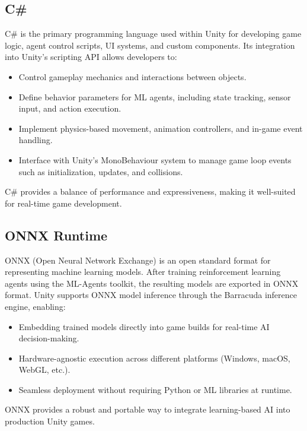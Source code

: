 \documentclass[12pt,oneside,openright,a4paper]{cpe-english-project}
\begin{document}
\subsection{C\#}
C\# is the primary programming language used within Unity for developing game logic, agent control scripts, UI systems, and custom components. Its integration into Unity's scripting API allows developers to:
\begin{itemize}
\item Control gameplay mechanics and interactions between objects.
\item Define behavior parameters for ML agents, including state tracking, sensor input, and action execution.
\item Implement physics-based movement, animation controllers, and in-game event handling.
\item Interface with Unity's MonoBehaviour system to manage game loop events such as initialization, updates, and collisions.
\end{itemize}
C\# provides a balance of performance and expressiveness, making it well-suited for real-time game development.

\subsection{ONNX Runtime}
ONNX (Open Neural Network Exchange) is an open standard format for representing machine learning models. After training reinforcement learning agents using the ML-Agents toolkit, the resulting models are exported in ONNX format. Unity supports ONNX model inference through the Barracuda inference engine, enabling:
\begin{itemize}
\item Embedding trained models directly into game builds for real-time AI decision-making.
\item Hardware-agnostic execution across different platforms (Windows, macOS, WebGL, etc.).
\item Seamless deployment without requiring Python or ML libraries at runtime.
\end{itemize}
ONNX provides a robust and portable way to integrate learning-based AI into production Unity games.
\end{document}
